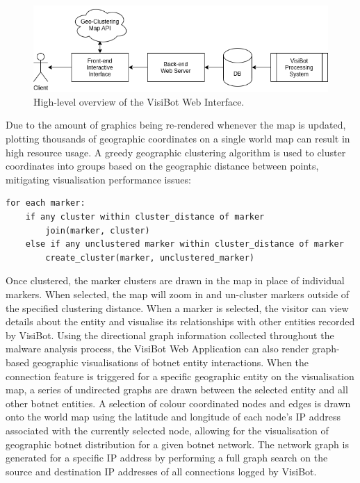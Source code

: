 \begin{figure}[!htb]
    \centering
    \includegraphics[width=0.7\linewidth]{flowcharts/design_overview_webapp.png}
    \caption{High-level overview of the VisiBot Web Interface.}
    \label{fig:webapp_design_overview} 
\end{figure}

Due to the amount of graphics being re-rendered whenever the map is updated, plotting thousands of geographic coordinates on a single world map can result in high resource usage. A greedy geographic clustering algorithm is used to cluster coordinates into groups based on the geographic distance between points, mitigating visualisation performance issues:

\begin{lstlisting}[caption={Pseudocode for Greedy clustering algorithm based on an example by \citet{MarkerClustering}}]
for each marker:
    if any cluster within cluster_distance of marker
        join(marker, cluster)
    else if any unclustered marker within cluster_distance of marker
        create_cluster(marker, unclustered_marker)
\end{lstlisting}

Once clustered, the marker clusters are drawn in the map in place of individual markers. When selected, the map will zoom in and un-cluster markers outside of the specified clustering distance. When a marker is selected, the visitor can view details about the entity and visualise its relationships with other entities recorded by VisiBot. Using the directional graph information collected throughout the malware analysis process, the VisiBot Web Application can also render graph-based geographic visualisations of botnet entity interactions. When the connection feature is triggered for a specific geographic entity on the visualisation map, a series of undirected graphs are drawn between the selected entity and all other botnet entities. A selection of colour coordinated nodes and edges is drawn onto the world map using the latitude and longitude of each node's IP address associated with the currently selected node, allowing for the visualisation of geographic botnet distribution for a given botnet network. The network graph is generated for a specific IP address by performing a full graph search on the source and destination IP addresses of all connections logged by VisiBot. 